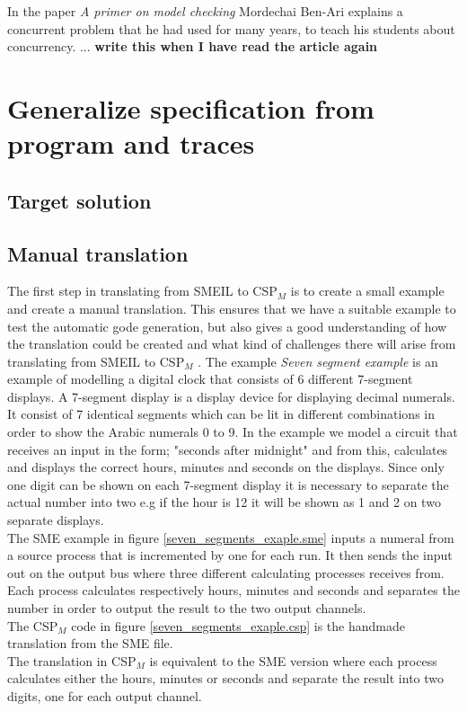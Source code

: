 \documentclass[a4paper]{report}
\newcommand{\cspm}{CSP$_M$ }
\begin{document}
In the paper \textit{A primer on model checking}\cite{Ben-ari2010} Mordechai Ben-Ari explains a concurrent problem that he had used for many years, to teach his students about concurrency. ... \textbf{write this when I have read the article again}



\chapter{Generalize specification from program and traces}
\section{Target solution}

\section{Manual translation}
The first step in translating from SMEIL to \cspm is to create a small example and create a manual translation. This ensures that we have a suitable example to test the automatic gode generation, but also gives a good understanding of how the translation could be created and what kind of challenges there will arise from translating from SMEIL to \cspm.
The example \textit{Seven segment example} is an example of modelling a digital clock that consists of 6 different 7-segment displays. A 7-segment display is a display device for displaying decimal numerals. It consist of 7 identical segments which can be lit in different combinations in order to show the Arabic numerals 0 to 9. In the example we model a circuit that receives an input in the form; "seconds after midnight" and from this, calculates and displays the correct hours, minutes and seconds on the displays. Since only one digit can be shown on each 7-segment display it is necessary to separate the actual number into two e.g if the hour is 12 it will be shown as 1 and 2 on two separate displays. \\ The SME example in figure \ref{seven_segments_exaple.sme} inputs a numeral from a source process that is incremented by one for each run. It then sends the input out on the output bus where three different calculating processes receives from. Each process calculates respectively hours, minutes and seconds and separates the number in order to output the result to the two output channels. \\ The \cspm code in figure \ref{seven_segments_exaple.csp} is the handmade translation from the SME file. \\ The translation in \cspm is equivalent to the SME version where each process calculates either the hours, minutes or seconds and separate the result into two digits, one for each output channel.\\
\end{document}
